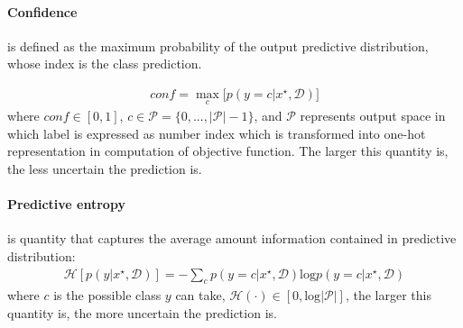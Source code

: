 \paragraph{Confidence} is defined as the maximum probability of the output predictive distribution, whose index is the class prediction.

\begin{equation}\label{confidence}	
\begin{aligned}
conf = \max_c \big[ p(y=c|x^\star, \mathcal D) \big]
\end{aligned}
\end{equation}
where $conf \in [0,1]$, $c \in \mathcal P = \{0,...,|\mathcal P|-1\}$, and $\mathcal P$ represents output space in which label is expressed as number index which is transformed into one-hot representation in computation of objective function. The larger this quantity is, the less uncertain the prediction is. 

\paragraph{Predictive entropy} is quantity that captures the average amount information contained in predictive distribution\cite{shannon1948mathematical}: 
\begin{equation}\label{entropy}	
\begin{aligned}
\mathcal H[p(y|x^\star, \mathcal D)] = -\sum_{c}p(y=c|x^\star, \mathcal D)\text{log}p(y=c|x^\star, \mathcal D)
\end{aligned}
\end{equation}
where $c$ is the possible class $y$ can take, $\mathcal H(\cdot) \in [0, \text{log}{|\mathcal P|}]$, the larger this quantity is, the more uncertain the prediction is.

